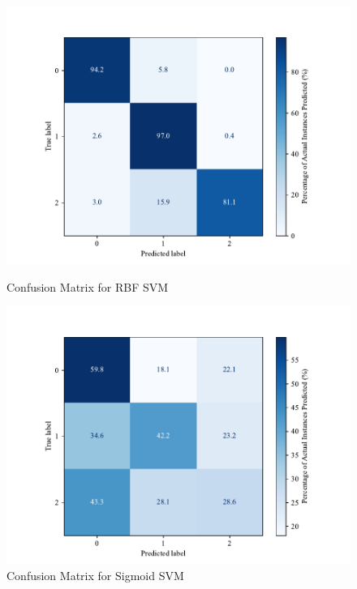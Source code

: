         \begin{figure}[htbp]
        \centering
        \begin{minipage}[b]{0.45\textwidth}
          \centering
          \includegraphics[width=\textwidth]{images/confusion_matrix_rbf.pdf}
          \caption{Confusion Matrix for RBF SVM}
          \label{fig:confusion_rbf}
        \end{minipage}
        \hfill
        \begin{minipage}[b]{0.45\textwidth}
          \centering
          \includegraphics[width=\textwidth]{images/confusion_matrix_sigmoid_svm.pdf}
          \caption{Confusion Matrix for Sigmoid SVM}
          \label{fig:confusion_sigmoid}
        \end{minipage}
        \end{figure}
        
